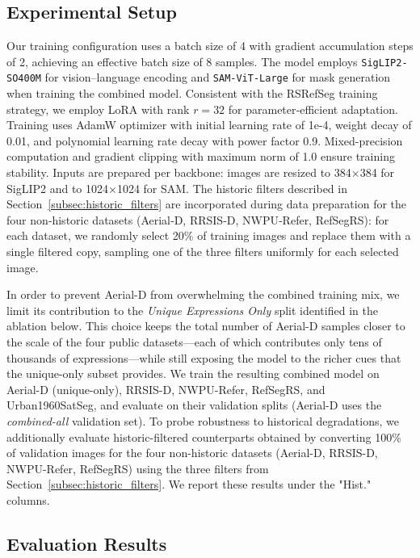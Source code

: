 \subsection{Experimental Setup}
\label{subsec:experimental_setup}

Our training configuration uses a batch size of 4 with gradient accumulation steps of 2, achieving an effective batch size of 8 samples. The model employs \texttt{SigLIP2-SO400M} for vision–language encoding and \texttt{SAM-ViT-Large} for mask generation when training the combined model. Consistent with the RSRefSeg training strategy, we employ LoRA with rank \(r=32\) for parameter‑efficient adaptation. Training uses AdamW optimizer\cite{adamw} with initial learning rate of 1e-4, weight decay of 0.01, and polynomial learning rate decay with power factor 0.9. Mixed-precision computation and gradient clipping with maximum norm of 1.0 ensure training stability. Inputs are prepared per backbone: images are resized to 384×384 for SigLIP2 and to 1024×1024 for SAM. The historic filters described in Section~\ref{subsec:historic_filters} are incorporated during data preparation for the four non‑historic datasets (Aerial‑D, RRSIS‑D, NWPU‑Refer, RefSegRS): for each dataset, we randomly select 20\% of training images and replace them with a single filtered copy, sampling one of the three filters uniformly for each selected image.

In order to prevent Aerial-D from overwhelming the combined training mix, we limit its contribution to the \emph{Unique Expressions Only} split identified in the ablation below. This choice keeps the total number of Aerial-D samples closer to the scale of the four public datasets—each of which contributes only tens of thousands of expressions—while still exposing the model to the richer cues that the unique-only subset provides. We train the resulting combined model on Aerial-D (unique-only), RRSIS-D\cite{liu2024rotated}, NWPU-Refer\cite{yang2024large}, RefSegRS\cite{yuan2023rrsis}, and Urban1960SatSeg\cite{hao2025urban1960satseg}, and evaluate on their validation splits (Aerial-D uses the \emph{combined-all} validation set). To probe robustness to historical degradations, we additionally evaluate historic-filtered counterparts obtained by converting 100\% of validation images for the four non-historic datasets (Aerial-D, RRSIS-D, NWPU-Refer, RefSegRS) using the three filters from Section~\ref{subsec:historic_filters}. We report these results under the "Hist." columns.

\subsection{Evaluation Results}
\label{subsec:evaluation_results}


